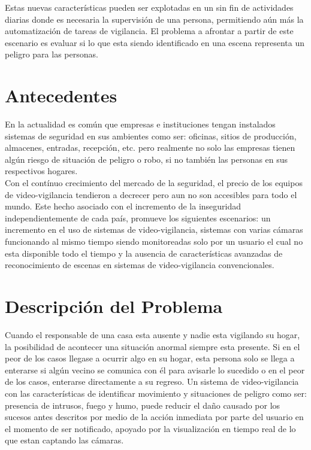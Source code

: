 Estas nuevas características pueden ser explotadas en un sin fin de actividades diarias donde es necesaria la supervisión de una persona, permitiendo aún más la automatización de tareas de vigilancia. El problema a afrontar a partir de este escenario es evaluar si lo que esta siendo identificado en una escena representa un peligro para las personas.\\

\section{Antecedentes}
En la actualidad es común que empresas e instituciones tengan instalados sistemas de seguridad en sus ambientes como ser: oficinas, sitios de producción, almacenes, entradas, recepción, etc. pero realmente no solo las empresas tienen algún riesgo de situación de peligro o robo, si no también las personas en sus respectivos hogares.\\

Con el contínuo crecimiento del mercado de la seguridad, el precio de los equipos de video-vigilancia tendieron a decrecer pero aun no son accesibles para todo el mundo. Este hecho asociado con el incremento de la inseguridad independientemente de cada país, promueve los siguientes escenarios: un incremento en el uso de sistemas de video-vigilancia, sistemas con varias cámaras funcionando al mismo tiempo siendo monitoreadas solo por un usuario el cual no esta disponible todo el tiempo y la ausencia de características avanzadas de reconocimiento de escenas en sistemas de video-vigilancia convencionales.\

\section{Descripción del Problema}
Cuando el responsable de una casa esta ausente y nadie esta vigilando su hogar, la posibilidad de acontecer una situación anormal siempre esta presente. Si en el peor de los casos llegase a ocurrir algo en su hogar, esta persona solo se llega a enterarse si algún vecino se comunica con él para avisarle lo sucedido o en el peor de los casos, enterarse directamente a su regreso. Un sistema de video-vigilancia con las características de identificar movimiento y situaciones de peligro como ser: presencia de intrusos, fuego y humo, puede reducir el daño causado por los sucesos antes descritos por medio de la acción inmediata por parte del usuario en el momento de ser notificado, apoyado por la visualización en tiempo real de lo que estan captando las cámaras.\\

